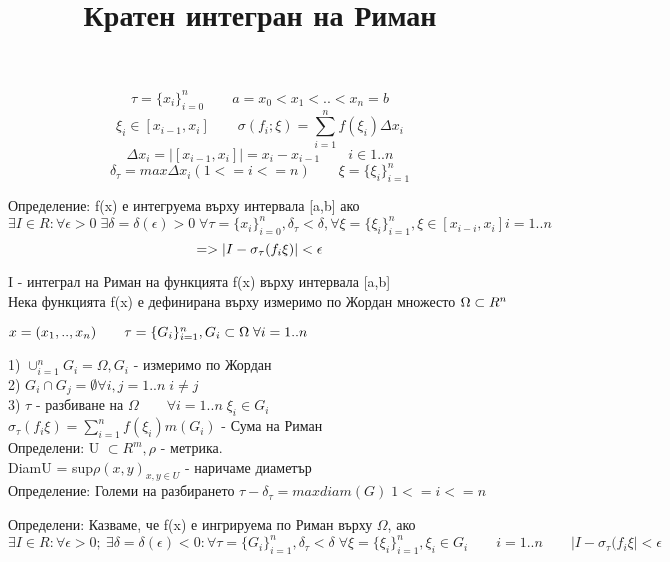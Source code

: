 \documentclass{article}
\title{Кратен интегран на Риман}
\begin{document}
\maketitle


$$\tau=\{x_{i}\}_{i=0}^n \qquad a = x_{0} < x_{1} < .. < x_{n} = b $$
$$\xi_{i}\in[x_{i-1},x_{i}] \qquad \sigma(f_{i};\xi) = \sum_{i=1}^{n} f(\xi_{i})  \Delta x_{i} $$
$$\Delta x_{i} = |[x_{i-1},x_{i}]| = x_{i} - x_{i-1} \qquad i \in 1..n$$
$$\delta_{\tau} = max\Delta x_{i} {( 1 <= i <= n)} \qquad \xi = \{\xi_{i}\}_{i=1}^n $$

Определение: f(x) е интегруема върху интервала [a,b] ако $\exists I \in R : \forall \epsilon > 0 \; \exists \delta = \delta(\epsilon)>0 \; \forall \tau=\{x_{i}\}_{i=0}^n , \delta_{\tau} < \delta, \forall \xi = \{\xi_{i}\}_{i=1}^n , \xi \in [x_{i-i},x_{i}] i = 1..n$ \\

$$ => |I - \sigma_{\tau}(f_{i} \xi)| < \epsilon \\ $$

I - интеграл на Риман на функцията f(x) върху интервала [a,b] \\

Нека функцията f(x) е дефинирана върху измеримо по Жордан множесто $\Omega \subset R^n \\$

$x = (x_{1}, .. , x_{n}) \qquad \tau = \{ G_{i}\}_{i=1}^n, G_{i} \subset \Omega \; \forall i = 1..n \\$

1) $\cup_{i=1}^n G_{i} = \Omega , G_{i}$ - измеримо по Жордан\\

2) $G_{i} \cap G_{j} = \emptyset \forall i,j = 1..n \; i \neq j$ \\

3) $\tau$ - разбиване на $\Omega \qquad \forall i = 1..n \; \xi_{i} \in G_{i}$ \\

$\sigma_{\tau}(f_{i} \xi) = \sum_{i=1}^{n} f(\xi_{i})m(G_{i})$ - Сума на Риман \\

Определени: U $\subset R^m, \rho$ - метрика.\\
DiamU = sup$\rho(x,y)_{x,y \in U}$ - наричаме диаметър\\

Определение: Големи на разбирането $\tau - \delta_{\tau} = maxdiam(G) \; 1 <= i <= n$

Определени: Казваме, че f(x) е ингрируема по Риман върху $\Omega$, ако $\exists I \in R: \forall \epsilon>0 ;\ \exists \delta = \delta(\epsilon)<0: \forall \tau = \{G_{i}\}_{i=1}^n, \delta_{\tau} < \delta \; \forall \xi=\{\xi_{i}\}_{i=1}^n, \xi_{i} \in G_{i} \qquad i = 1..n \qquad |I - \sigma_{\tau}(f_{i} \xi| < \epsilon$
\end{document}
